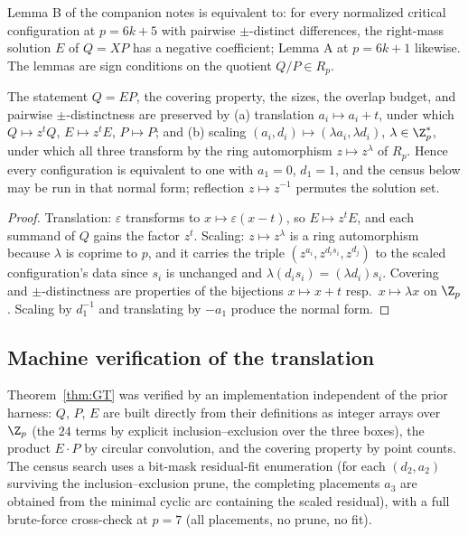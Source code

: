 \begin{corollary}\label{cor:signform}
Lemma B of the companion notes is equivalent to: for every normalized
critical configuration at $p=6k+5$ with pairwise $\pm$-distinct differences,
the right-mass solution $E$ of $Q=XP$ has a negative coefficient; Lemma A at
$p=6k+1$ likewise. The lemmas are sign conditions on the quotient
$Q/P\in R_p$.
\end{corollary}

\begin{proposition}\label{prop:normalform}
The statement $Q=EP$, the covering property, the sizes, the overlap budget,
and pairwise $\pm$-distinctness are preserved by \textup{(a)} translation
$a_i\mapsto a_i+t$, under which $Q\mapsto z^{t}Q$, $E\mapsto z^{t}E$,
$P\mapsto P$; and \textup{(b)} scaling $(a_i,d_i)\mapsto(\lambda a_i,
\lambda d_i)$, $\lambda\in\Z_p^{*}$, under which all three transform by the
ring automorphism $z\mapsto z^{\lambda}$ of $R_p$. Hence every configuration
is equivalent to one with $a_1=0$, $d_1=1$, and the census below may be run
in that normal form; reflection $z\mapsto z^{-1}$ permutes the solution set.
\end{proposition}

\begin{proof}
Translation: $\varepsilon$ transforms to $x\mapsto\varepsilon(x-t)$, so
$E\mapsto z^tE$, and each summand of $Q$ gains the factor $z^t$. Scaling:
$z\mapsto z^\lambda$ is a ring automorphism because $\lambda$ is coprime to
$p$, and it carries the triple $(z^{a_i},z^{d_is_i},z^{d_j})$ to the scaled
configuration's data since $s_i$ is unchanged and
$\lambda(d_is_i)=(\lambda d_i)s_i$. Covering and $\pm$-distinctness are
properties of the bijections $x\mapsto x+t$ resp.\ $x\mapsto\lambda x$ on
$\Z_p$. Scaling by $d_1^{-1}$ and translating by $-a_1$ produce the normal
form.
\end{proof}

\subsection{Machine verification of the translation}\label{sec:gt-verify}

Theorem~\ref{thm:GT} was verified by an implementation independent of the
prior harness: $Q$, $P$, $E$ are built directly from their definitions as
integer arrays over $\Z_p$ (the $24$ terms by explicit inclusion--exclusion
over the three boxes), the product $E\cdot P$ by circular convolution, and
the covering property by point counts. The census search uses a
bit-mask residual-fit enumeration (for each $(d_2,a_2)$ surviving the
inclusion--exclusion prune, the completing placements $a_3$ are obtained
from the minimal cyclic arc containing the scaled residual), with a full
brute-force cross-check at $p=7$ (all placements, no prune, no fit).

